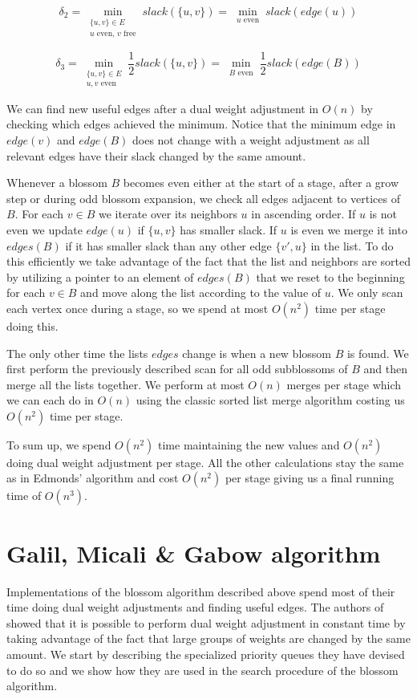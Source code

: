\[\delta_2=\min_{\substack{\{u, v\}\in E \\ \text{$u$ even, $v$ free}}} slack(\{u, v\}) = \min_{\substack{u \text{ even}}} slack(edge(u))\] 

\[\delta_3=\min_{\substack{\{u, v\}\in E \\ \text{$u, v$ even}}} \frac{1}{2}slack(\{u, v\}) = \min_{\substack{B \text{ even}}} \frac{1}{2}slack(edge(B))\] 

We can find new useful edges after a dual weight adjustment in $O(n)$ by checking which edges achieved the minimum. Notice that the minimum edge in $edge(v)$ and $edge(B)$ does not change with a weight adjustment as all relevant edges have their slack changed by the same amount.

Whenever a blossom $B$ becomes even either at the start of a stage, after a grow step or during odd blossom expansion, we check all edges adjacent to vertices of $B$. For each $v \in B$ we iterate over its neighbors $u$ in ascending order. If $u$ is not even we update $edge(u)$ if $\{u, v\}$ has smaller slack. If $u$ is even we merge it into $edges(B)$ if it has smaller slack than any other edge $\{v', u\}$ in the list. To do this efficiently we take advantage of the fact that the list and neighbors are sorted by utilizing a pointer to an element of $edges(B)$ that we reset to the beginning for each $v \in B$ and move along the list according to the value of $u$. We only scan each vertex once during a stage, so we spend at most $O(n^2)$ time per stage doing this.

The only other time the lists $edges$ change is when a new blossom $B$ is found. We first perform the previously described scan for all odd subblossoms of $B$ and then merge all the lists together. We perform at most $O(n)$ merges per stage which we can each do in $O(n)$ using the classic sorted list merge algorithm costing us $O(n^2)$ time per stage.

To sum up, we spend $O(n^2)$ time maintaining the new values and $O(n^2)$ doing dual weight adjustment per stage. All the other calculations stay the same as in Edmonds' algorithm and cost $O(n^2)$ per stage giving us a final running time of $O(n^3)$.

\section{Galil, Micali \& Gabow algorithm}

Implementations of the blossom algorithm described above spend most of their time doing dual weight adjustments and finding useful edges. The authors of~\cite{micali1980v} showed that it is possible to perform dual weight adjustment in constant time by taking advantage of the fact that large groups of weights are changed by the same amount. We start by describing the specialized priority queues they have devised to do so and we show how they are used in the search procedure of the blossom algorithm.

